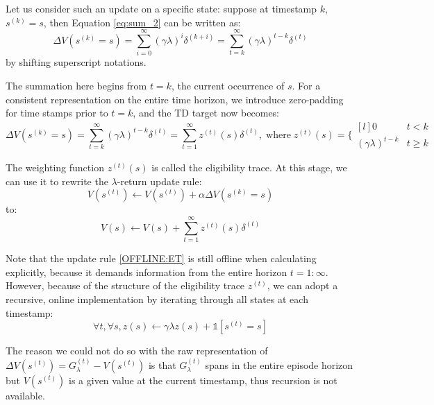 \documentclass[11pt]{article}
\begin{document}
Let us consider such an update on a specific state: suppose at timestamp $k$, $s^{(k)}=s$, then Equation \ref{eq:sum_2} can be written as:
\begin{equation}
    \Delta V\left(s^{(k)}=s\right) = \sum_{i=0}^\infty (\gamma\lambda)^i\delta^{(k+i)} = \sum_{t=k}^\infty (\gamma\lambda)^{t-k}\delta^{(t)}
\end{equation}
by shifting superscript notations.

The summation here begins from $t=k$, the current occurrence of $s$. For a consistent representation on the entire time horizon, we introduce zero-padding for time stamps prior to $t=k$, and the TD target now becomes:
\begin{equation}
    \Delta V\left(s^{(k)}=s\right) = \sum_{t=k}^\infty (\gamma\lambda)^{t-k}\delta^{(t)} = \sum_{t=1}^\infty z^{(t)}(s)\delta^{(t)}, \;\mathrm{where}\; z^{(t)}(s) = \bigg\{
    \begin{matrix*}[l]
    0 & t<k\\
    (\gamma\lambda)^{t-k}& t\geq k
    \end{matrix*}
\end{equation}

The weighting function $z^{(t)}(s)$ is called the eligibility trace. At this stage, we can use it to rewrite the $\lambda$-return update rule:
\begin{equation}
    V(s^{(t)}) \leftarrow V(s^{(t)}) + \alpha\Delta V\left(s^{(k)}=s\right)
\end{equation}
to:
\begin{equation}
    V(s) \leftarrow V(s) + \sum_{t=1}^\infty z^{(t)}(s)\delta^{(t)}
    \label{OFFLINE:ET}
\end{equation}

Note that the update rule \ref{OFFLINE:ET} is still offline when calculating explicitly, because it demands information from the entire horizon $t=1:\infty$. However, because of the structure of the eligibility trace $z^{(t)}$, we can adopt a recursive, online implementation by iterating through all states at each timestamp:
\begin{equation}
    \forall t, \forall s, z(s)\leftarrow \gamma\lambda z(s)+\mathds{1}[s^{(t)}=s]
\end{equation}

The reason we could not do so with the raw representation of $\Delta V\left(s^{(t)}\right) = G_\lambda^{(t)} - V\left(s^{(t)}\right)$ is that $G_\lambda^{(t)}$ spans in the entire episode horizon but $V\left(s^{(t)}\right)$ is a given value at the current timestamp, thus recursion is not available.
\end{document}
